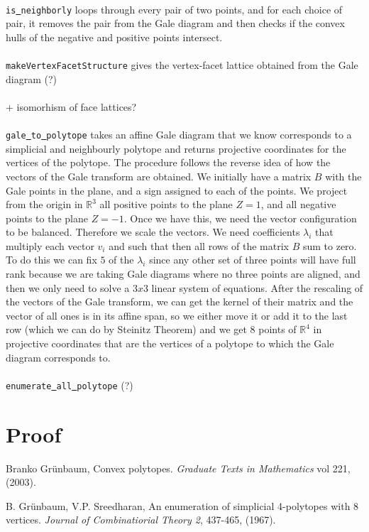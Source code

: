 \documentclass[paper=a4, fontsize=11pt]{scrartcl} %
\newcommand{\RR}{{\mathbb R}}
\theoremstyle{definition}
\begin{document}
\\
\texttt{is\underline{ }neighborly} loops through every pair of two points, and for each choice of pair, it removes the pair from the Gale diagram and then checks if the convex hulls of the negative and positive points intersect.\\
\\
\texttt{makeVertexFacetStructure} gives the vertex-facet lattice obtained from the Gale diagram (?)\\
\\
+ isomorhism of face lattices?\\
\\
\texttt{gale\underline{ }to\underline{ }polytope} takes an affine Gale diagram that we know corresponds to a simplicial and neighbourly polytope and returns projective coordinates for the vertices of the polytope. The procedure follows the reverse idea of how the vectors of the Gale transform are obtained. We initially have a matrix $B$ with the Gale points in the plane, and a sign assigned to each of the points. We project from the origin in $\RR^3$ all positive points to the plane $Z = 1$, and all negative points to the plane $Z = -1$. Once we have this, we need the vector configuration to be balanced. Therefore we scale the vectors. We need coefficients $\lambda_i$ that multiply each vector $v_i$ and such that then all rows of the matrix $B$ sum to zero. To do this we can fix $5$ of the $\lambda_i$ since any other set of three points will have full rank because we are taking Gale diagrams where no three points are aligned, and then we only need to solve a $3x3$ linear system of equations. After the rescaling of the vectors of the Gale transform, we can get the kernel of their matrix and the vector of all ones is in its affine span, so we either move it or add it to the last row (which we can do by Steinitz Theorem) and we get 8 points of $\RR^4$ in projective coordinates that are the vertices of a polytope to which the Gale diagram corresponds to.\\
\\
\texttt{enumerate\underline{ }all\underline{ }polytope} (?)
\section{Proof}

\begin{thebibliography}{9}

Branko Grünbaum, Convex polytopes. \textit{Graduate
Texts in Mathematics} vol 221, (2003).

B. Grünbaum, V.P. Sreedharan, An enumeration of simplicial 4-polytopes with 8 vertices. \textit{Journal of Combinatiorial Theory 2}, 437-465, (1967).

\end{thebibliography}
\end{document}
